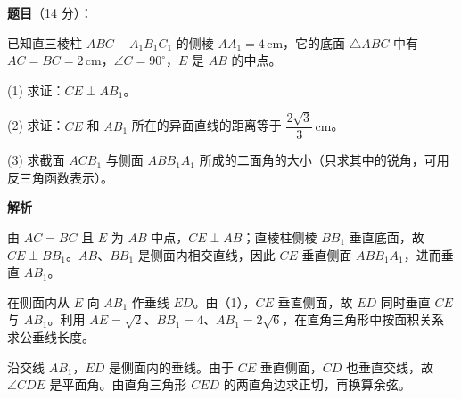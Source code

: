 \begin{answer}

\textbf{题目}（14 分）：

已知直三棱柱 $ABC-A_1B_1C_1$ 的侧棱 $AA_1=4\,\mathrm{cm}$，它的底面 $\triangle ABC$ 中有 $AC=BC=2\,\mathrm{cm}$，$\angle C=90^\circ$，$E$ 是 $AB$ 的中点。

(1) 求证：$CE\perp AB_1$。

(2) 求证：$CE$ 和 $AB_1$ 所在的异面直线的距离等于 $\dfrac{2\sqrt3}{3}\,\mathrm{cm}$。

(3) 求截面 $ACB_1$ 与侧面 $ABB_1A_1$ 所成的二面角的大小（只求其中的锐角，可用反三角函数表示）。

\textbf{解析}


由 $AC=BC$ 且 $E$ 为 $AB$ 中点，$CE\perp AB$；直棱柱侧棱 $BB_1$ 垂直底面，故 $CE\perp BB_1$。$AB$、$BB_1$ 是侧面内相交直线，因此 $CE$ 垂直侧面 $ABB_1A_1$，进而垂直 $AB_1$。


在侧面内从 $E$ 向 $AB_1$ 作垂线 $ED$。由（1），$CE$ 垂直侧面，故 $ED$ 同时垂直 $CE$ 与 $AB_1$。利用 $AE=\sqrt2$、$BB_1=4$、$AB_1=2\sqrt6$，在直角三角形中按面积关系求公垂线长度。


沿交线 $AB_1$，$ED$ 是侧面内的垂线。由于 $CE$ 垂直侧面，$CD$ 也垂直交线，故 $\angle CDE$ 是平面角。由直角三角形 $CED$ 的两直角边求正切，再换算余弦。




\end{answer}
